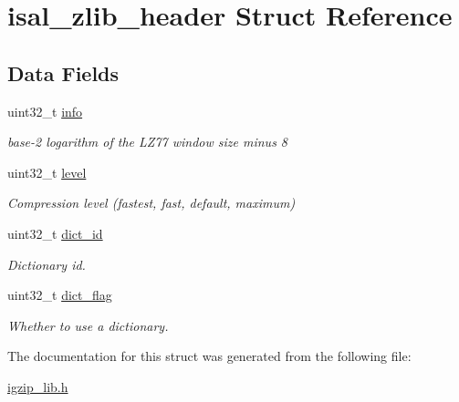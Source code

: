 \hypertarget{structisal__zlib__header}{\section{isal\-\_\-zlib\-\_\-header Struct Reference}
\label{structisal__zlib__header}
}
\subsection*{Data Fields}
\begin{DoxyCompactItemize}
\item 
\hypertarget{structisal__zlib__header_aa1eab37684857680e607bf54806c836a}{uint32\-\_\-t \hyperlink{structisal__zlib__header_aa1eab37684857680e607bf54806c836a}{info}}\label{structisal__zlib__header_aa1eab37684857680e607bf54806c836a}

\begin{DoxyCompactList}\small\item\em base-\/2 logarithm of the L\-Z77 window size minus 8 \end{DoxyCompactList}\item 
\hypertarget{structisal__zlib__header_ae5d1a42e558f3d8cdcd34c8ba80f2b92}{uint32\-\_\-t \hyperlink{structisal__zlib__header_ae5d1a42e558f3d8cdcd34c8ba80f2b92}{level}}\label{structisal__zlib__header_ae5d1a42e558f3d8cdcd34c8ba80f2b92}

\begin{DoxyCompactList}\small\item\em Compression level (fastest, fast, default, maximum) \end{DoxyCompactList}\item 
\hypertarget{structisal__zlib__header_a8a60d9a952c4aadb5d5f8d96b823c14f}{uint32\-\_\-t \hyperlink{structisal__zlib__header_a8a60d9a952c4aadb5d5f8d96b823c14f}{dict\-\_\-id}}\label{structisal__zlib__header_a8a60d9a952c4aadb5d5f8d96b823c14f}

\begin{DoxyCompactList}\small\item\em Dictionary id. \end{DoxyCompactList}\item 
\hypertarget{structisal__zlib__header_a9ff86b868b00983aa7de3617a4042079}{uint32\-\_\-t \hyperlink{structisal__zlib__header_a9ff86b868b00983aa7de3617a4042079}{dict\-\_\-flag}}\label{structisal__zlib__header_a9ff86b868b00983aa7de3617a4042079}

\begin{DoxyCompactList}\small\item\em Whether to use a dictionary. \end{DoxyCompactList}\end{DoxyCompactItemize}


The documentation for this struct was generated from the following file\-:\begin{DoxyCompactItemize}
\item 
\hyperlink{igzip__lib_8h}{igzip\-\_\-lib.\-h}\end{DoxyCompactItemize}
